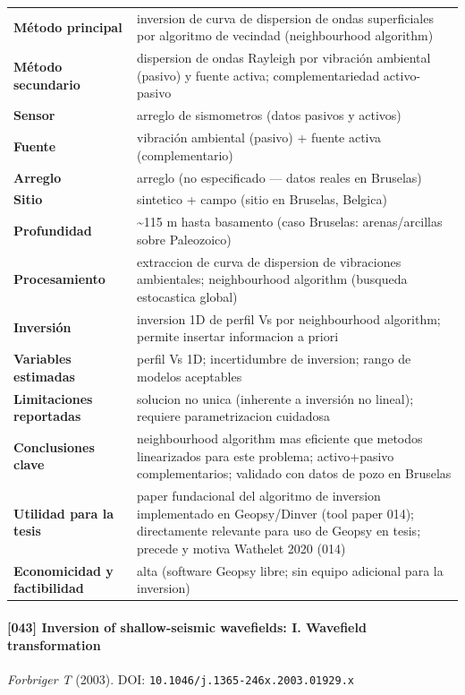\begin{center}\scriptsize
\begin{tabularx}{\textwidth}{@{}>{\bfseries}p{3.3cm} X@{}}
\toprule
M\'etodo principal & inversion de curva de dispersion de ondas superficiales por algoritmo de vecindad (neighbourhood algorithm) \\
M\'etodo secundario & dispersion de ondas Rayleigh por vibración ambiental (pasivo) y fuente activa; complementariedad activo-pasivo \\
Sensor & arreglo de sismometros (datos pasivos y activos) \\
Fuente & vibración ambiental (pasivo) + fuente activa (complementario) \\
Arreglo & arreglo (no especificado --- datos reales en Bruselas) \\
Sitio & sintetico + campo (sitio en Bruselas, Belgica) \\
Profundidad & \textasciitilde{}115 m hasta basamento (caso Bruselas: arenas/arcillas sobre Paleozoico) \\
Procesamiento & extraccion de curva de dispersion de vibraciones ambientales; neighbourhood algorithm (busqueda estocastica global) \\
Inversi\'on & inversion 1D de perfil Vs por neighbourhood algorithm; permite insertar informacion a priori \\
Variables estimadas & perfil Vs 1D; incertidumbre de inversion; rango de modelos aceptables \\
Limitaciones reportadas & solucion no unica (inherente a inversión no lineal); requiere parametrizacion cuidadosa \\
Conclusiones clave & neighbourhood algorithm mas eficiente que metodos linearizados para este problema; activo+pasivo complementarios; validado con datos de pozo en Bruselas \\
Utilidad para la tesis & paper fundacional del algoritmo de inversion implementado en Geopsy/Dinver (tool paper 014); directamente relevante para uso de Geopsy en tesis; precede y motiva Wathelet 2020 (014) \\
Economicidad y factibilidad & alta (software Geopsy libre; sin equipo adicional para la inversion) \\
\bottomrule
\end{tabularx}
\end{center}

\paragraph{[043] Inversion of shallow-seismic wavefields: I. Wavefield transformation} \emph{Forbriger T} (2003).
{\scriptsize DOI: \texttt{10.1046/j.1365-246x.2003.01929.x}}


